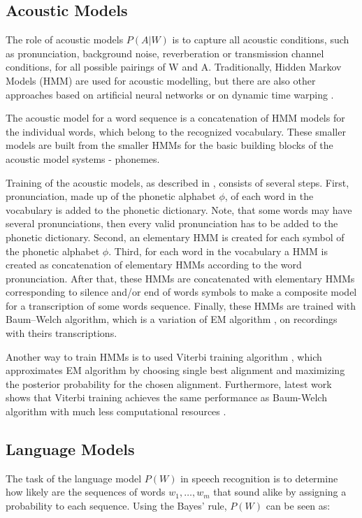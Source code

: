\subsection{Acoustic Models}
The role of acoustic models $P(A|W)$ is to capture all acoustic conditions,
  such as pronunciation, background noise, reverberation or transmission channel conditions,
  for all possible pairings of W and A.
Traditionally, Hidden Markov Models (HMM) are used for acoustic modelling,
  but there are also other approaches based on artificial neural networks \cite{lippmann1989review} or on dynamic time warping \cite{rabiner1981isolated}.

The acoustic model for a word sequence is a concatenation of HMM models for the individual words,
  which belong to the recognized vocabulary.
These smaller models are built from the smaller HMMs for the basic building blocks of the acoustic model systems - phonemes.

Training of the acoustic models, as described in \cite{frederick1997statistical}, consists of several steps.
First, pronunciation, made up of the phonetic alphabet $\phi$, of each word in the vocabulary is added to the phonetic dictionary.
Note, that some words may have several pronunciations,
  then every valid pronunciation has to be added to the phonetic dictionary.
Second, an elementary HMM is created for each symbol of the phonetic alphabet $\phi$.
Third, for each word in the vocabulary a HMM is created as concatenation of elementary HMMs according to the word pronunciation.
After that, these HMMs are concatenated with elementary HMMs corresponding to silence and/or end of words symbols to make a composite model for a transcription of some words sequence.
Finally, these HMMs are trained with Baum--Welch \cite{welch2003hidden} algorithm,
  which is a variation of EM algorithm \cite{dempster1977maximum},
  on recordings with theirs transcriptions.

Another way to train HMMs is to used Viterbi training algorithm \cite{franzini1990connectionist},
  which approximates EM algorithm by choosing single best alignment and maximizing the posterior probability for the chosen alignment.
Furthermore, latest work shows that Viterbi training achieves the same performance as Baum-Welch algorithm with much less computational resources \cite{rodriguez2003comparative}.

\subsection{Language Models}
The task of the language model $P(W)$ in speech recognition is
  to determine how likely are the sequences of words $w_1,\dots,w_m$ that sound alike
  by assigning a probability to each sequence.
Using the Bayes' rule, $P(W)$ can be seen as:

